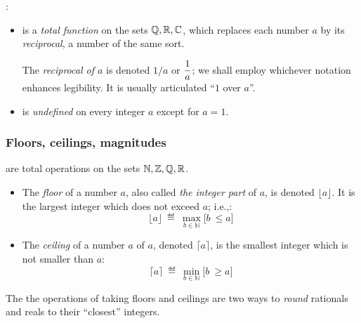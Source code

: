 \medskip

:
\begin{itemize}
\item
{}
is a {\em total function} on the sets $\mathbb{Q}, \mathbb{R}, \mathbb{C}$, which replaces each
number $a$ by its {\em reciprocal}, 
a number of the same sort.

The {\it reciprocal of $a$} is denoted $1/a$ or $\displaystyle {1
  \over a}$; we shall employ whichever notation enhances legibility.
It is usually articulated ``$1$ over $a$''.

\item
is {\em undefined} on every integer $a$ except for $a=1$.
\end{itemize}

\subsubsection{Floors, ceilings, magnitudes}

are total operations on the sets $\mathbb{N}, \mathbb{Z}, \mathbb{Q}, \mathbb{R}$.
\begin{itemize}
\item
The {\it floor} of a number $a$, also called {\it the integer part}
of $a$, is denoted $\lfloor a \rfloor$.  It is the largest integer
which does not exceed $a$; i.e.,:
\[
\lfloor a \rfloor \ \eqdef \ \max_{b \in {\mathbb{N}}} \Big[ b \ \leq a \Big]
\]
\item
The {\it ceiling} of a number $a$
of $a$, denoted $\lceil a \rceil$, is the smallest integer which is 
not smaller than $a$:
\[
\lceil a \rceil \ \eqdef \ \min_{b \in {\mathbb{N}}} \Big[ b \ \geq a \Big]
\]
\end{itemize}
The the operations of taking floors and ceilings are two ways to {\em
  round} rationals and reals to their ``closest''
integers.

\medskip


